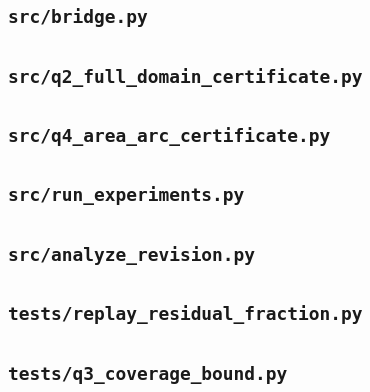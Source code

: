\subsection*{\texttt{src/bridge.py}}

\subsection*{\texttt{src/q2\_full\_domain\_certificate.py}}

\subsection*{\texttt{src/q4\_area\_arc\_certificate.py}}

\subsection*{\texttt{src/run\_experiments.py}}

\subsection*{\texttt{src/analyze\_revision.py}}

\subsection*{\texttt{tests/replay\_residual\_fraction.py}}

\subsection*{\texttt{tests/q3\_coverage\_bound.py}}

